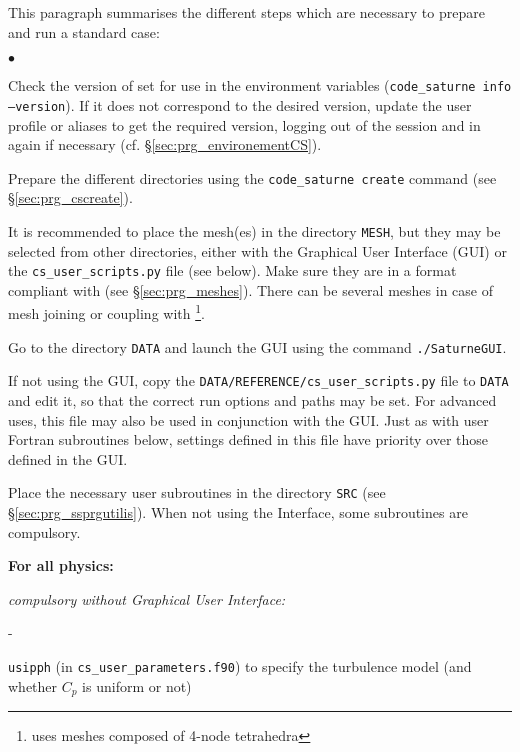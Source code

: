 {{{This paragraph summarises the different steps which are necessary to
prepare and run a standard case:

\begin{list}{$\bullet$}{}

\item Check the version of \CS set for use in the environment variables
(\texttt{code\_saturne~info --version}). If it does not correspond to
the desired version, update the user profile or aliases to get the
required version, logging out of the session and in again if necessary (cf.
\S\ref{sec:prg_environementCS}).

\item Prepare the different directories using the \texttt{code\_saturne~create}
command (see \S\ref{sec:prg_cscreate}).

\item It is recommended to place the mesh(es) in the directory \texttt{MESH},
but they may be selected from other directories, either with the Graphical User Interface (GUI)
 or the \texttt{cs\_user\_scripts.py} file (see below). Make sure they are
in a format compliant with \CS (see \S\ref{sec:prg_meshes}). There can be
several meshes in case of mesh joining or coupling with
\syrthes\footnote{ uses meshes composed of 4-node tetrahedra}.

\item Go to the directory \texttt{DATA} and launch the
      GUI using the command \texttt{./SaturneGUI}.

\item If not using the GUI, copy the
  \texttt{DATA/REFERENCE/cs\_user\_scripts.py} file to \texttt{DATA} and
  edit it, so that the correct run options and paths may be set. For advanced
  uses, this file may also be used in conjunction with the GUI. Just as with
  user Fortran subroutines below, settings defined in this file have priority
  over those defined in the GUI.

\item Place the necessary user subroutines in the directory \texttt{SRC} (see
\S\ref{sec:prg_ssprgutilis}). When not using the Interface, some subroutines are
compulsory.

\begin{list}{}{}

\item {\bf For all physics:}

    \begin{list}{}{}
        \item {\em compulsory without Graphical User Interface:}
        \begin{list}{-}{}
            \item \texttt{usipph} (in \texttt{cs\_user\_parameters.f90}) to
              specify the turbulence model (and whether $C_p$ is uniform or not)


\end{list}
\end{list}
\end{list}
\end{list}}}}
